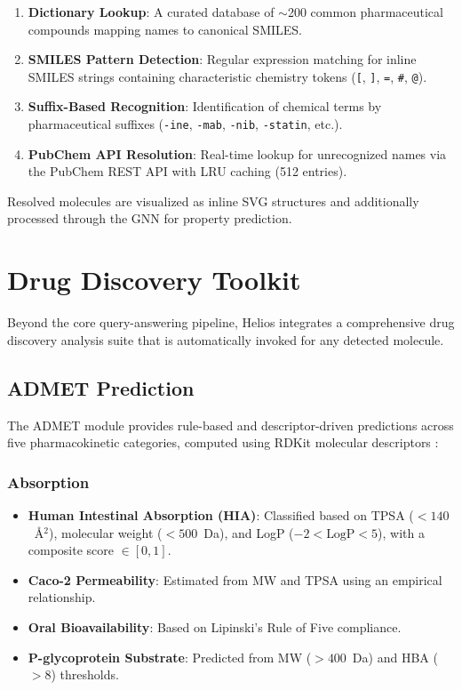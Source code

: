 \documentclass[conference]{IEEEtran}
\begin{document}
\begin{enumerate}
    \item \textbf{Dictionary Lookup}: A curated database of $\sim$200 common pharmaceutical compounds mapping names to canonical SMILES.
    \item \textbf{SMILES Pattern Detection}: Regular expression matching for inline SMILES strings containing characteristic chemistry tokens (\texttt{[}, \texttt{]}, \texttt{=}, \texttt{\#}, \texttt{@}).
    \item \textbf{Suffix-Based Recognition}: Identification of chemical terms by pharmaceutical suffixes (\texttt{-ine}, \texttt{-mab}, \texttt{-nib}, \texttt{-statin}, etc.).
    \item \textbf{PubChem API Resolution}: Real-time lookup for unrecognized names via the PubChem REST API with LRU caching (512 entries).
\end{enumerate}

Resolved molecules are visualized as inline SVG structures and additionally processed through the GNN for property prediction.

\section{Drug Discovery Toolkit}
\label{sec:drug_discovery}

Beyond the core query-answering pipeline, Helios integrates a comprehensive drug discovery analysis suite that is automatically invoked for any detected molecule.

\subsection{ADMET Prediction}

The ADMET module provides rule-based and descriptor-driven predictions across five pharmacokinetic categories, computed using RDKit molecular descriptors \cite{landrum2016rdkit}:

\subsubsection{Absorption}
\begin{itemize}
    \item \textbf{Human Intestinal Absorption (HIA)}: Classified based on TPSA ($< 140$~\AA$^2$), molecular weight ($< 500$~Da), and LogP ($-2 < \text{LogP} < 5$), with a composite score $\in [0, 1]$.
    \item \textbf{Caco-2 Permeability}: Estimated from MW and TPSA using an empirical relationship.
    \item \textbf{Oral Bioavailability}: Based on Lipinski's Rule of Five compliance.
    \item \textbf{P-glycoprotein Substrate}: Predicted from MW ($> 400$~Da) and HBA ($> 8$) thresholds.
\end{itemize}
\end{document}
